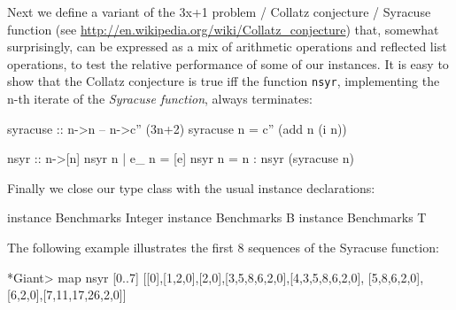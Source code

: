 \documentclass{TOOLS/llncs}
\begin{document}
Next we define a variant of the 3x+1 problem / Collatz conjecture / Syracuse
function %
(see \url{http://en.wikipedia.org/wiki/Collatz_conjecture})
that, somewhat surprisingly, can be expressed as
a mix of arithmetic operations and reflected list operations, to test
the relative performance of some of our instances. It is easy to show
that the Collatz conjecture is true iff the function {\tt nsyr}, implementing the
n-th iterate of the {\em Syracuse function}, always
terminates:
\begin{code}
  syracuse  :: n->n
  -- n->c'' (3n+2)
  syracuse n = c'' (add n (i n))

  nsyr :: n->[n]
  nsyr n | e_ n = [e]
  nsyr n = n : nsyr (syracuse n)
\end{code}
Finally we close our type class with the usual instance declarations:
\begin{code}
instance Benchmarks Integer
instance Benchmarks B
instance Benchmarks T
\end{code}
The following example illustrates
the first 8 sequences of the Syracuse function:
\begin{codex}
*Giant> map nsyr [0..7]
[[0],[1,2,0],[2,0],[3,5,8,6,2,0],[4,3,5,8,6,2,0],
     [5,8,6,2,0],[6,2,0],[7,11,17,26,2,0]]
\end{codex}

\begin{code}
\end{code}
\end{document}
